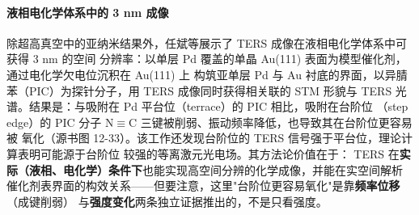 \paragraph{液相电化学体系中的 3 nm 成像}
除超高真空中的亚纳米结果外，任斌等展示了 TERS 成像在液相电化学体系中可获得 3 nm 的空间
分辨率：以单层 Pd 覆盖的单晶 Au(111) 表面为模型催化剂，通过电化学欠电位沉积在 Au(111) 上
构筑亚单层 Pd 与 Au 衬底的界面，以异腈苯（PIC）为探针分子，用 TERS 成像同时获得相关联的
STM 形貌与 TERS 光谱。结果是：与吸附在 Pd 平台位（terrace）的 PIC 相比，吸附在台阶位
（step edge）的 PIC 分子 N$\equiv$C 三键被削弱、振动频率降低，也导致其在台阶位更容易被
氧化（源书图 12-33）。该工作还发现台阶位的 TERS 信号强于平台位，理论计算表明可能源于台阶位
较强的等离激元光电场。其方法论价值在于：
TERS 在\textbf{实际（液相、电化学）条件下}也能实现高空间分辨的化学成像，并能在实空间解析
催化剂表界面的构效关系——但要注意，这里"台阶位更容易氧化"是靠\textbf{频率位移}（成键削弱）
与\textbf{强度变化}两条独立证据推出的，不是只看强度。

